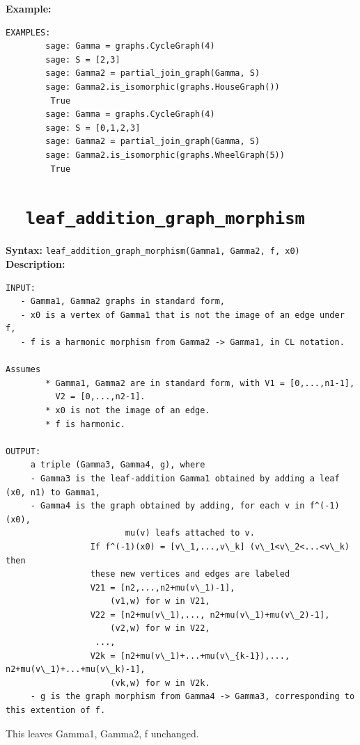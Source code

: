 \documentclass{article}
\begin{document}
\textbf{Example:}
\begin{verbatim}
EXAMPLES:
        sage: Gamma = graphs.CycleGraph(4)
        sage: S = [2,3]
        sage: Gamma2 = partial_join_graph(Gamma, S)
        sage: Gamma2.is_isomorphic(graphs.HouseGraph())
         True
        sage: Gamma = graphs.CycleGraph(4)
        sage: S = [0,1,2,3]
        sage: Gamma2 = partial_join_graph(Gamma, S)
        sage: Gamma2.is_isomorphic(graphs.WheelGraph(5))
         True
\end{verbatim}

\section{\tt \ \ leaf\_addition\_graph\_morphism}

\textbf{Syntax:} \verb}leaf_addition_graph_morphism(Gamma1, Gamma2, f, x0)}\\

\textbf{Description:}
\begin{verbatim}
INPUT:
   - Gamma1, Gamma2 graphs in standard form,  
   - x0 is a vertex of Gamma1 that is not the image of an edge under f, 
   - f is a harmonic morphism from Gamma2 -> Gamma1, in CL notation.
    
Assumes 
        * Gamma1, Gamma2 are in standard form, with V1 = [0,...,n1-1],
          V2 = [0,...,n2-1]. 
        * x0 is not the image of an edge.
        * f is harmonic.

OUTPUT:
     a triple (Gamma3, Gamma4, g), where
     - Gamma3 is the leaf-addition Gamma1 obtained by adding a leaf (x0, n1) to Gamma1, 
     - Gamma4 is the graph obtained by adding, for each v in f^(-1)(x0), 
                        mu(v) leafs attached to v. 
                 If f^(-1)(x0) = [v\_1,...,v\_k] (v\_1<v\_2<...<v\_k) then 
                 these new vertices and edges are labeled 
                 V21 = [n2,...,n2+mu(v\_1)-1], 
                     (v1,w) for w in V21,
                 V22 = [n2+mu(v\_1),..., n2+mu(v\_1)+mu(v\_2)-1], 
                     (v2,w) for w in V22,
                  ..., 
                 V2k = [n2+mu(v\_1)+...+mu(v\_{k-1}),..., n2+mu(v\_1)+...+mu(v\_k)-1], 
                     (vk,w) for w in V2k.
     - g is the graph morphism from Gamma4 -> Gamma3, corresponding to this extention of f.
\end{verbatim}
    
    This leaves Gamma1, Gamma2, f unchanged.
\end{document}

